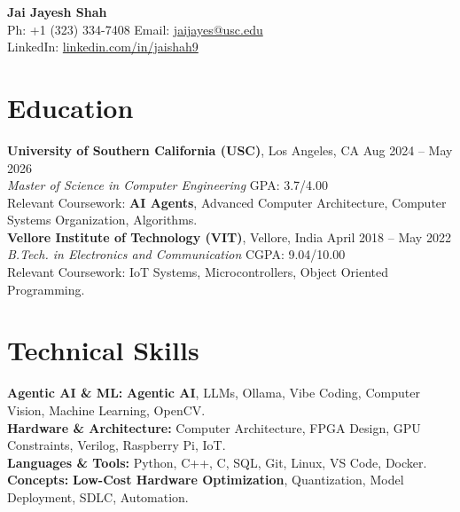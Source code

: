 \documentclass[letterpaper,10pt]{article}
\begin{document}
\begin{center}
    {\LARGE \textbf{Jai Jayesh Shah}} \\
    \vspace{2pt}
    \small
    Ph: +1 (323) 334-7408 \quad Email: \href{mailto:jaijayes@usc.edu}{jaijayes@usc.edu} \\
    LinkedIn: \href{https://www.linkedin.com/in/jaishah9}{linkedin.com/in/jaishah9} \\
    \vspace{-8pt}
\end{center}

\section*{Education}
\textbf{University of Southern California (USC)}, Los Angeles, CA \hfill Aug 2024 -- May 2026 \\
\textit{Master of Science in Computer Engineering} \hfill GPA: 3.7/4.00 \\
Relevant Coursework: \textbf{AI Agents}, Advanced Computer Architecture, Computer Systems Organization, Algorithms. \\
\vspace{2pt}
\textbf{Vellore Institute of Technology (VIT)}, Vellore, India \hfill April 2018 -- May 2022 \\
\textit{B.Tech. in Electronics and Communication} \hfill CGPA: 9.04/10.00 \\
Relevant Coursework: IoT Systems, Microcontrollers, Object Oriented Programming.

\section*{Technical Skills}
\textbf{Agentic AI \& ML:} \textbf{Agentic AI}, LLMs, Ollama, Vibe Coding, Computer Vision, Machine Learning, OpenCV. \\
\textbf{Hardware \& Architecture:} Computer Architecture, FPGA Design, GPU Constraints, Verilog, Raspberry Pi, IoT. \\
\textbf{Languages \& Tools:} Python, C++, C, SQL, Git, Linux, VS Code, Docker. \\
\textbf{Concepts:} \textbf{Low-Cost Hardware Optimization}, Quantization, Model Deployment, SDLC, Automation.

\end{document}
